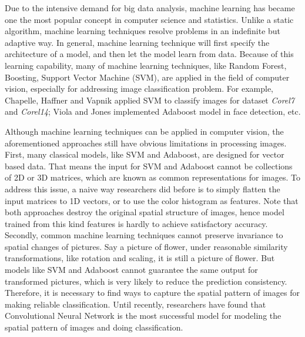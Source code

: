\documentclass[11pt,oneside,a4paper]{article}
\numberwithin{equation}{section}
\begin{document}
Due to the intensive demand for big data analysis, machine learning has became one the most popular concept in computer science and statistics. Unlike a static algorithm, machine learning techniques resolve problems in an indefinite but adaptive way. In general, machine learning technique will first specify the architecture of a model, and then let the model learn from data. Because of this learning capability, many of machine learning techniques, like Random Forest, Boosting, Support Vector Machine (SVM), are applied in the field of computer vision, especially for addressing image classification problem. For example, Chapelle, Haffner and Vapnik\cite{chapelle1999support} applied SVM to classify images for dataset \emph{Corel7} and \emph{Corel14}; Viola and Jones\cite{viola2004robust} implemented Adaboost model in face detection, etc.

Although machine learning techniques can be applied in computer vision, the aforementioned approaches still have obvious limitations in processing images. First, many classical models, like SVM and Adaboost, are designed for vector based data. That means the input for SVM and Adaboost cannot be collections of 2D or 3D matrices, which are known as common representations for images. To address this issue, a naive way researchers did before is to simply flatten the input matrices to 1D vectors, or to use the color histogram as features. Note that both approaches destroy the original spatial structure of images, hence model trained from this kind features is hardly to achieve satisfactory accuracy. Secondly, common machine learning techniques cannot preserve invariance to spatial changes of pictures. Say a picture of flower, under reasonable similarity transformations, like rotation and scaling, it is still a picture of flower. But models like SVM and Adaboost cannot guarantee the same output for transformed pictures, which is very likely to reduce the prediction consistency. Therefore, it is necessary to find ways to capture the spatial pattern of images for making reliable classification. Until recently, researchers have found that Convolutional Neural Network is the most successful model for modeling the spatial pattern of images and doing classification.
\end{document}
